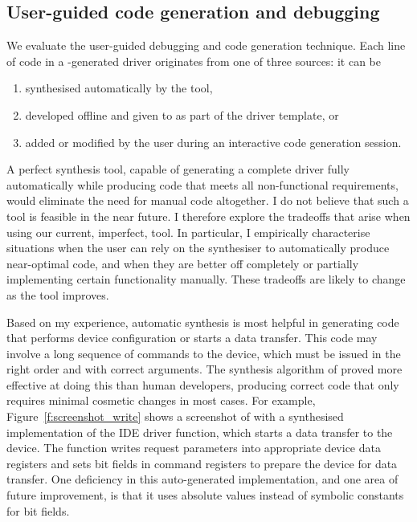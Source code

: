 
\subsection{User-guided code generation and debugging} 
We evaluate the user-guided debugging and code generation technique.  Each line of code in a \termite-generated driver originates from one of three sources: it can be 
\begin{enumerate} 
    \item synthesised automatically by the tool, 
    \item developed offline and given to \termite as part of the driver template, or 
    \item added or modified by the user during an interactive code generation session.  
\end{enumerate}
A perfect synthesis tool, capable of generating a complete driver fully automatically while producing code that meets all non-functional requirements, would eliminate the need for manual code altogether.  I do not believe that such a tool is feasible in the near future.  I therefore explore the tradeoffs that arise when using our current, imperfect, tool.  In particular, I empirically characterise situations when the user can rely on the synthesiser to automatically produce near-optimal code, and when they are better off completely or partially implementing certain functionality manually.  These tradeoffs are likely to change as the tool improves.

Based on my experience, automatic synthesis is most helpful in generating code that performs device configuration or starts a data transfer.  This code may involve a long sequence of commands to the device, which must be issued in the right order and with correct arguments.  The synthesis algorithm of \termite proved more effective at doing this than human developers, producing correct code that only requires minimal cosmetic changes in most cases.  For example, Figure~\ref{f:screenshot_write} shows a screenshot of \termite with a synthesised implementation of the IDE driver  function, which starts a data transfer to the device.  The function writes request parameters into appropriate device data registers and sets bit fields in command registers to prepare the device for data transfer.  One deficiency in this auto-generated implementation, and one area of future improvement, is that it uses absolute values instead of symbolic constants for bit fields.


